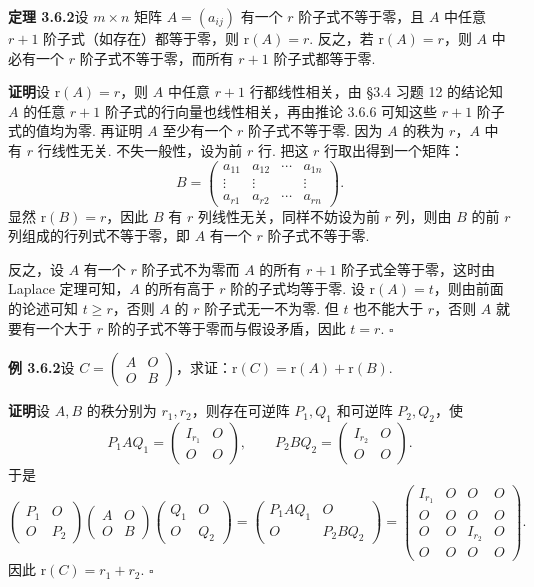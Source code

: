 \documentclass[UTF8,12pt,a4paper,fontset=fandol]{ctexart}
\begin{document}
\noindent\textbf{定理 3.6.2}\quad 设 $m\times n$ 矩阵 $A=(a_{ij})$ 有一个 $r$ 阶子式不等于零，且 $A$ 中任意 $r+1$ 阶子式（如存在）都等于零，则 $\mathrm{r}(A)=r$. 反之，若 $\mathrm{r}(A)=r$，则 $A$ 中必有一个 $r$ 阶子式不等于零，而所有 $r+1$ 阶子式都等于零.

\noindent\textbf{证明}\quad 设 $\mathrm{r}(A)=r$，则 $A$ 中任意 $r+1$ 行都线性相关，由 §3.4 习题 12 的结论知 $A$ 的任意 $r+1$ 阶子式的行向量也线性相关，再由推论 3.6.6 可知这些 $r+1$ 阶子式的值均为零. 再证明 $A$ 至少有一个 $r$ 阶子式不等于零. 因为 $A$ 的秩为 $r$，$A$ 中有 $r$ 行线性无关. 不失一般性，设为前 $r$ 行. 把这 $r$ 行取出得到一个矩阵：
\[
B=\left(\begin{array}{cccc}
a_{11}&a_{12}&\cdots&a_{1n}\\
\vdots&\vdots&&\vdots\\
a_{r1}&a_{r2}&\cdots&a_{rn}
\end{array}\right).
\]
显然 $\mathrm{r}(B)=r$，因此 $B$ 有 $r$ 列线性无关，同样不妨设为前 $r$ 列，则由 $B$ 的前 $r$ 列组成的行列式不等于零，即 $A$ 有一个 $r$ 阶子式不等于零.

反之，设 $A$ 有一个 $r$ 阶子式不为零而 $A$ 的所有 $r+1$ 阶子式全等于零，这时由 Laplace 定理可知，$A$ 的所有高于 $r$ 阶的子式均等于零. 设 $\mathrm{r}(A)=t$，则由前面的论述可知 $t\geq r$，否则 $A$ 的 $r$ 阶子式无一不为零. 但 $t$ 也不能大于 $r$，否则 $A$ 就要有一个大于 $r$ 阶的子式不等于零而与假设矛盾，因此 $t=r$. $\square$

\noindent\textbf{例 3.6.2}\quad 设 $C=\left(\begin{array}{cc}A&O\\O&B\end{array}\right)$，求证：$\mathrm{r}(C)=\mathrm{r}(A)+\mathrm{r}(B)$.

\noindent\textbf{证明}\quad 设 $A,B$ 的秩分别为 $r_1,r_2$，则存在可逆阵 $P_1,Q_1$ 和可逆阵 $P_2,Q_2$，使
\[
P_1AQ_1=\left(\begin{array}{cc}
I_{r_1}&O\\
O&O
\end{array}\right),\qquad
P_2BQ_2=\left(\begin{array}{cc}
I_{r_2}&O\\
O&O
\end{array}\right).
\]
于是
\[
\left(\begin{array}{cc}
P_1&O\\
O&P_2
\end{array}\right)
\left(\begin{array}{cc}
A&O\\
O&B
\end{array}\right)
\left(\begin{array}{cc}
Q_1&O\\
O&Q_2
\end{array}\right)
=
\left(\begin{array}{cc}
P_1AQ_1&O\\
O&P_2BQ_2
\end{array}\right)
=
\left(\begin{array}{cccc}
I_{r_1}&O&O&O\\
O&O&O&O\\
O&O&I_{r_2}&O\\
O&O&O&O
\end{array}\right).
\]
因此 $\mathrm{r}(C)=r_1+r_2$. $\square$
\end{document}
